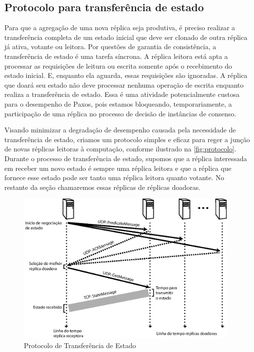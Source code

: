 \subsection{Protocolo para transferência de estado}

Para que a agregação de uma nova réplica seja produtiva, é preciso realizar a
transferência completa de um estado inicial que deve ser clonado de outra réplica já
ativa, votante ou leitora. Por questões de garantia de consistência, a transferência de
estado é uma tarefa síncrona. A réplica leitora está apta a processar as requisições de
leitura ou escrita somente após o recebimento do estado inicial. E, enquanto ela aguarda,
essas requisições são ignoradas. A réplica que doará seu estado não deve processar nenhuma
operação de escrita enquanto realiza a transferência de estado. Essa é uma atividade
potencialmente custosa para o desempenho de Paxos, pois estamos bloqueando,
temporariamente, a participação de uma réplica no processo de decisão de instâncias de
consenso.

Visando minimizar a degradação de desempenho causada pela necessidade de transferência de
estado, criamos um protocolo simples e eficaz para reger a junção de novas réplicas
leitoras à computação, conforme ilustrado na \autoref{fig:protocolo}. Durante o processo
de transferência de estado, supomos que a réplica interessada em receber um novo estado é
sempre uma réplica leitora e que a réplica que fornece esse estado pode ser tanto uma
réplica leitora quanto votante. No restante da seção chamaremos essas réplicas de réplicas
doadoras.

\begin{figure}[ht]
  \centering
  \includegraphics[width=11cm]{conteudo/capitulos/figuras/transferencia_estado.eps}
  \caption{Protocolo de Transferência de Estado}
  \label{fig:protocolo}
\end{figure}

